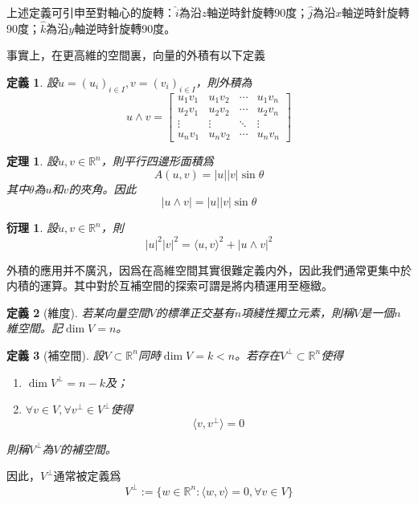\documentclass[12pt]{article}
\newcommand{\innerprod}[2]{\langle{#1},{#2}\rangle}
\newtheorem{definition}{定義}
\newtheorem*{theorem}{定理}
\newtheorem*{corollary}{衍理}
\begin{document}
    上述定義可引申至對軸心的旋轉：$\hat{i}$為沿$z$軸逆時針旋轉90度；$\hat{j}$為沿$x$軸逆時針旋轉90度；$\hat{k}$為沿$y$軸逆時針旋轉90度。

    事實上，在更高維的空間裏，向量的外積有以下定義

    \begin{definition}
        設$u=(u_i)_{i\in I},v=(v_i)_{i\in I}$，則外積為$$u\wedge v =\begin{bmatrix}
            u_1v_1&u_1v_2&\cdots&u_1v_n\\
            u_2v_1&u_2v_2&\cdots&u_2v_n\\
            \vdots&\vdots&\ddots&\vdots\\
            u_n v_1&u_n v_2&\cdots&u_n v_n
        \end{bmatrix}$$
    \end{definition}

    \begin{theorem}
        設$u,v\in \mathbb{R}^n$，則平行四邊形面積爲$$A(u,v)=|u||v|\sin{\theta}$$其中$\theta$為$u$和$v$的夾角。因此$$|u\wedge v|=|u||v|\sin{\theta}$$
    \end{theorem}

    \begin{corollary}
        設$u,v\in \mathbb{R}^n$，則$$|u|^2|v|^2=\innerprod{u}{v}^2+|u\wedge v|^2$$
    \end{corollary}

    外積的應用并不廣汎，因爲在高維空間其實很難定義内外，因此我們通常更集中於内積的運算。其中對於互補空間的探索可謂是將内積運用至極緻。
    
    \begin{definition}[維度]
        若某向量空間$V$的標準正交基有$n$項綫性獨立元素，則稱$V$是一個$n$維空間。記$\dim{V}=n$。
    \end{definition}

    \begin{definition}[補空間]
        設$V \subset \mathbb{R}^n$同時$\dim{V}=k< n$。若存在$V^{\perp}\subset \mathbb{R}^n$使得\begin{enumerate}
            \item $\dim{V^{\perp}}=n-k$及；
            \item $\forall v\in V, \forall v^{\perp}\in V^{\perp}$使得$$\innerprod{v}{v^{\perp}}=0$$
        \end{enumerate}
        則稱$V^{\perp}$為$V$的補空間。
    \end{definition}

    因此，$V^{\perp}$通常被定義爲$$V^{\perp}:=\{w\in\mathbb{R}^n:\innerprod{w}{v}=0, \forall v\in V\}$$
\end{document}
